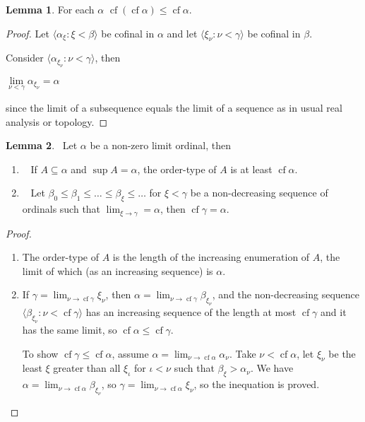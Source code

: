 \documentclass[8pt]{article}
\theoremstyle{definition}
\theoremstyle{definition}
\theoremstyle{definition}
\theoremstyle{definition}
\theoremstyle{definition}
\theoremstyle{definition}
\theoremstyle{definition}
\theoremstyle{definition}
\newtheorem{lemma}{Lemma}[section]
\theoremstyle{definition}
\theoremstyle{definition}
\theoremstyle{definition}
\theoremstyle{definition}
\theoremstyle{definition}
\theoremstyle{definition}
\theoremstyle{question}
\begin{document}
\begin{lemma}
  For each $\alpha$ $\operatorname{cf} (\operatorname{cf} \alpha) \leq \operatorname{cf} \alpha$.
\end{lemma}

\begin{proof}
  Let $\langle \alpha_{\xi} : \xi < \beta \rangle$ be cofinal in $\alpha$ and let $\langle \xi_{\nu} : \nu < \gamma \rangle$ be cofinal in $\beta$.

  Consider $\langle \alpha_{\xi_{\nu}} : \nu < \gamma \rangle$, then
  \begin{center}
    $\lim \limits_{\nu < \gamma} \alpha_{\xi_{\nu}} = \alpha$
  \end{center}
  since the limit of a subsequence equals the limit of a sequence as in usual real analysis or topology.
\end{proof}

\begin{lemma}~\label{confin1}
  Let $\alpha$ be a non-zero limit ordinal, then

  \begin{enumerate}
    \item~\label{confin1.1} If $A \subseteq \alpha$ and $\sup A = \alpha$, the order-type of $A$ is at least $\operatorname{cf} \alpha$.
    \item~\label{confin1.2} Let $\beta_0 \leq \beta_1 \leq \dots \leq \beta_{\xi} \leq \dots $ for $\xi < \gamma$ 
    be a non-decreasing sequence of ordinals such that $\lim_{\xi \to \gamma} = \alpha$, then $\operatorname{cf} \gamma = \alpha$.
  \end{enumerate}
\end{lemma}

\begin{proof}
$ $

  \begin{enumerate}
    \item The order-type of $A$ is the length of the increasing enumeration of $A$, 
    the limit of which (as an increasing sequence) is $\alpha$.
    \item If $\gamma = \lim_{\nu \to \operatorname{cf} \gamma} \xi_{\nu}$,
    then $\alpha = \lim_{\nu \to \operatorname{cf} \gamma} \beta_{\xi_{\nu}}$,
    and the non-decreasing sequence $\langle \beta_{\xi_{\nu}} : \nu < \operatorname{cf} \gamma\rangle$
    has an increasing sequence of the length at most $\operatorname{cf} \gamma$ and it has the same limit, 
    so $\operatorname{cf} \alpha \leq \operatorname{cf} \gamma$.

    To show $\operatorname{cf} \gamma \leq \operatorname{cf} \alpha$, 
    assume $\alpha = \lim_{\nu \to \operatorname{cf} \alpha} \alpha_{\nu}$.
    Take $\nu < \operatorname{cf} \alpha$, 
    let $\xi_{\nu}$ be the least $\xi$ greater than all $\xi_{\iota}$ for $\iota < \nu$
    such that $\beta_{\xi} > \alpha_{\nu}$.
    We have $\alpha = \lim_{\nu \to \operatorname{cf} \alpha} \beta_{\xi_{\nu}}$, so
    $\gamma = \lim_{\nu \to \operatorname{cf} \alpha} \xi_{\nu}$, so the inequation is proved.
  \end{enumerate}
\end{proof}
\end{document}

